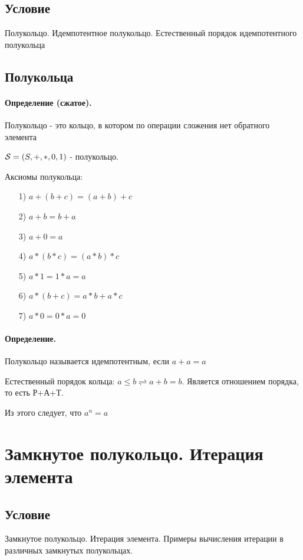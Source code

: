 \documentclass{report}
\begin{document}
\subsection{Условие}
Полукольцо. Идемпотентное полукольцо. Естественный порядок идемпотентного
полукольца

\subsection{Полукольца}
\paragraph*{Определение (сжатое).} Полукольцо - это кольцо, в котором по операции сложения нет обратного элемента

${\cal S} = (S, +, *, 0, 1)$ - полукольцо.

\medskip

Аксиомы полукольца:
\begin{itemize}
	\item[1)] $a + (b + c) = (a + b) + c$
	\item[2)] $a + b = b + a$
	\item[3)] $a + 0 = a$
	\item[4)] $a*(b*c) = (a*b)*c$
	\item[5)] $a*1=1*a=a$
	\item[6)] $a*(b+c)=a*b+a*c$
	\item[7)] $a*0 = 0*a=0$
\end{itemize}

\paragraph*{Определение.}
Полукольцо называется идемпотентным, если $a + a = a$

Естественный порядок кольца: $a \leq b \rightleftharpoons a + b = b$. Является отношением порядка, то есть Р+А+Т.

Из этого следует, что $a^n = a$

\newpage

\section{Замкнутое полукольцо. Итерация элемента}
\subsection{Условие}
Замкнутое полукольцо. Итерация элемента. Примеры вычисления итерации в
различных замкнутых полукольцах.
\end{document}
